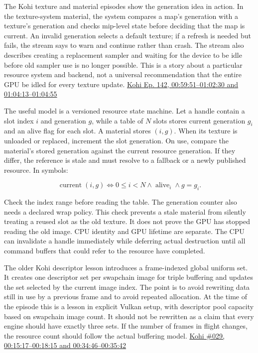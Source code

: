 The Kohi texture and material episodes show the generation idea in action. In the texture-system material, the system compares a map's generation with a texture's generation and checks mip-level state before deciding that the map is current. An invalid generation selects a default texture; if a refresh is needed but fails, the stream says to warn and continue rather than crash. The stream also describes creating a replacement sampler and waiting for the device to be idle before old sampler use is no longer possible. This is a story about a particular resource system and backend, not a universal recommendation that the entire GPU be idled for every texture update. \href{https://www.youtube.com/watch?v=xb23Y9o7tP4&t=59m51s}{Kohi Ep. 142, 00:59:51--01:02:30 and 01:04:13--01:04:55}

The useful model is a versioned resource state machine. Let a handle contain a slot index \(i\) and generation \(g\), while a table of \(N\) slots stores current generation \(g_i\) and an alive flag for each slot. A material stores \((i,g)\). When its texture is unloaded or replaced, increment the slot generation. On use, compare the material's stored generation against the current resource generation. If they differ, the reference is stale and must resolve to a fallback or a newly published resource. In symbols:

\[\operatorname{current}(i,g) \iff 0\le i<N \land \operatorname{alive}_i \land g=g_i.\]

Check the index range before reading the table. The generation counter also needs a declared wrap policy. This check prevents a stale material from silently treating a reused slot as the old texture. It does not prove the GPU has stopped reading the old image. CPU identity and GPU lifetime are separate. The CPU can invalidate a handle immediately while deferring actual destruction until all command buffers that could refer to the resource have completed.

The older Kohi descriptor lesson introduces a frame-indexed global uniform set. It creates one descriptor set per swapchain image for triple buffering and updates the set selected by the current image index. The point is to avoid rewriting data still in use by a previous frame and to avoid repeated allocation. At the time of the episode this is a lesson in explicit Vulkan setup, with descriptor pool capacity based on swapchain image count. It should not be rewritten as a claim that every engine should have exactly three sets. If the number of frames in flight changes, the resource count should follow the actual buffering model. \href{https://www.youtube.com/watch?v=yc40ixalLtU&t=15m17s}{Kohi \#029, 00:15:17--00:18:15 and 00:34:46--00:35:42}

